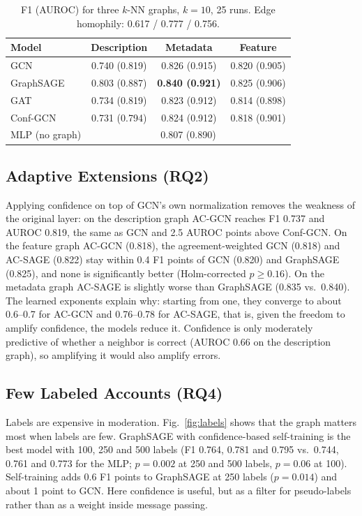\documentclass[conference,a4paper]{IEEEtran}
\begin{document}
\begin{table}[htbp]
\caption{F1 (AUROC) for three $k$-NN graphs, $k=10$, 25 runs. Edge homophily: 0.617 / 0.777 / 0.756.}
\label{tab:graph}
\centering
\footnotesize
\setlength{\tabcolsep}{3pt}
\begin{tabular}{@{}lccc@{}}
\toprule
Model & Description & Metadata & Feature\\
\midrule
GCN & 0.740 (0.819) & 0.826 (0.915) & 0.820 (0.905)\\
GraphSAGE & 0.803 (0.887) & \textbf{0.840 (0.921)} & 0.825 (0.906)\\
GAT & 0.734 (0.819) & 0.823 (0.912) & 0.814 (0.898)\\
Conf-GCN & 0.731 (0.794) & 0.824 (0.912) & 0.818 (0.901)\\
\midrule
MLP (no graph) & \multicolumn{3}{c}{0.807 (0.890)}\\
\bottomrule
\end{tabular}
\end{table}

\subsection{Adaptive Extensions (RQ2)}
Applying confidence on top of GCN's own normalization removes the weakness of the original layer: on the description graph AC-GCN reaches F1 0.737 and AUROC 0.819, the same as GCN and 2.5 AUROC points above Conf-GCN. On the feature graph AC-GCN (0.818), the agreement-weighted GCN (0.818) and AC-SAGE (0.822) stay within 0.4 F1 points of GCN (0.820) and GraphSAGE (0.825), and none is significantly better (Holm-corrected $p\ge0.16$). On the metadata graph AC-SAGE is slightly worse than GraphSAGE (0.835 vs.\ 0.840). The learned exponents explain why: starting from one, they converge to about 0.6--0.7 for AC-GCN and 0.76--0.78 for AC-SAGE, that is, given the freedom to amplify confidence, the models reduce it. Confidence is only moderately predictive of whether a neighbor is correct (AUROC 0.66 on the description graph), so amplifying it would also amplify errors.

\subsection{Few Labeled Accounts (RQ4)}
Labels are expensive in moderation. Fig.~\ref{fig:labels} shows that the graph matters most when labels are few. GraphSAGE with confidence-based self-training is the best model with 100, 250 and 500 labels (F1 0.764, 0.781 and 0.795 vs.\ 0.744, 0.761 and 0.773 for the MLP; $p=0.002$ at 250 and 500 labels, $p=0.06$ at 100). Self-training adds 0.6 F1 points to GraphSAGE at 250 labels ($p=0.014$) and about 1 point to GCN. Here confidence is useful, but as a filter for pseudo-labels rather than as a weight inside message passing.
\end{document}
